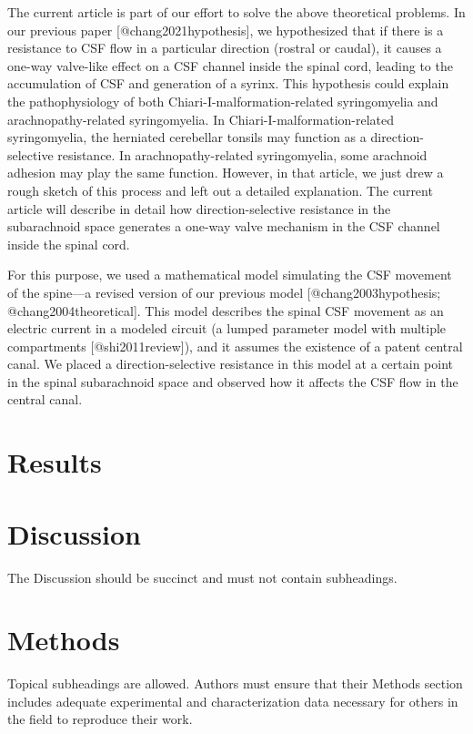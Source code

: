 \documentclass[fleqn,10pt]{wlscirep}
\begin{document}
The current article is part of our effort to solve the above theoretical
problems. In our previous paper [@chang2021hypothesis], we hypothesized
that if there is a resistance to CSF flow in a particular direction
(rostral or caudal), it causes a one-way valve-like effect on a CSF channel
inside the spinal cord, leading to the accumulation of CSF and generation
of a syrinx. This hypothesis could explain the pathophysiology of both
Chiari-I-malformation-related syringomyelia and arachnopathy-related
syringomyelia. In Chiari-I-malformation-related syringomyelia, the
herniated cerebellar tonsils may function as a direction-selective
resistance. In arachnopathy-related syringomyelia, some arachnoid adhesion
may play the same function.  However, in that article, we just drew a rough
sketch of this process and left out a detailed explanation. The current
article will describe in detail how direction-selective resistance in the
subarachnoid space generates a one-way valve mechanism in the CSF channel
inside the spinal cord.

For this purpose, we used a mathematical model simulating the CSF movement
of the spine—a revised version of our previous model [@chang2003hypothesis;
@chang2004theoretical]. This model describes the spinal CSF movement as an
electric current in a modeled circuit (a lumped parameter model with
multiple compartments [@shi2011review]), and it assumes the existence of a
patent central canal. We placed a direction-selective resistance in this
model at a certain point in the spinal subarachnoid space and observed how
it affects the CSF flow in the central canal.  \section*{Results}


\section*{Discussion}

The Discussion should be succinct and must not contain subheadings.

\section*{Methods}

Topical subheadings are allowed. Authors must ensure that their Methods section includes adequate experimental and characterization data necessary for others in the field to reproduce their work.
\end{document}
